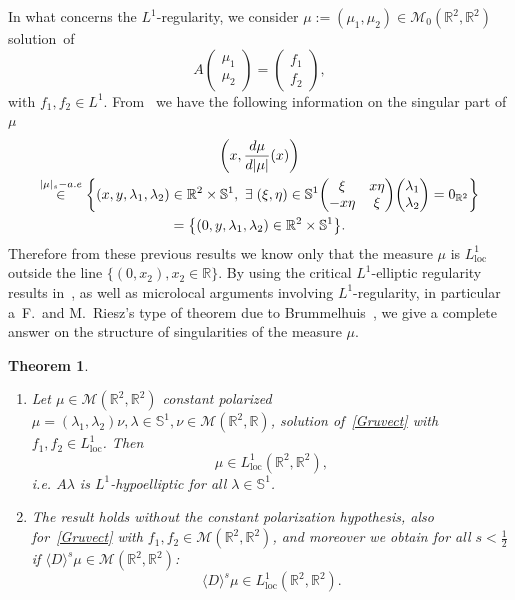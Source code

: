 \documentclass[10pt]{amsart}
\newtheorem{theo}{Theorem}[section]
\theoremstyle{definition}\newtheorem{defi}[theo]{Definition}\newtheorem{rema}[theo]{Remark}\newtheorem{exam}[theo]{Example}\newtheorem{exem}[theo]{Example}\newtheorem{nota}[theo]{Notation}
\DeclareMathOperator{\locc}{loc}
\newcommand{\bbR}{\mathbb{R}}
\newcommand{\bbS}{\mathbb{S}}
\newcommand{\clM}{\mathcal{M}}
\let\originalleft\left
\let\originalright\right
\renewcommand{\left}{\mathopen{}\mathclose\bgroup\originalleft}
\renewcommand{\right}{\aftergroup\egroup\originalright}
\newcommand*{\relabel}{\renewcommand{\labelenumi}{(\theenumi)}}
\newcommand*{\romanenumi}{\renewcommand*{\theenumi}{\roman{enumi}}\relabel}
\let\oldexists\exists
\renewcommand*{\exists}{\mathrel{\oldexists}}
\begin{document}
In what concerns the $L^1$-regularity, we consider $\mu:=(\mu_1,\mu_2)\in \clM_0(\bbR^2,\bbR^2)$ solution~of
\begin{equation}\label{Gruvect}
A
\begin{pmatrix}
\mu_1\\ \mu_2
\end{pmatrix}
=
\begin{pmatrix}
f_1\\ f_2
\end{pmatrix},
\end{equation}
with $f_1,f_2\in L^1$. From~\cite{DePRi} we have the following information on the singular part of $\mu$
\begin{multline*}
\left(x,\frac{d\mu}{d|\mu|}(x)\right)\\
\overset{|\mu|_s-a.e}{\in}\left\{(x,y,\lambda_1,\lambda_2)\in\bbR^2\times \bbS^1,\ \exists (\xi,\eta)\in\bbS^1
\begin{pmatrix}
\xi & x\eta\\ -x\eta & \xi
\end{pmatrix}
\begin{pmatrix}
\lambda_1\\ \lambda_2
\end{pmatrix}
=0_{\bbR^2}\right\}\\
=\left\{(0,y,\lambda_1,\lambda_2)\in\bbR^2\times \bbS^1\right\}.
\end{multline*}
Therefore from these previous results we know only that the measure $\mu$ is $L^1_{\locc}$ outside the line $\{(0,x_2), x_2\in\bbR\}$. By using the critical $L^1$-elliptic regularity results in~\cite{BBWFL1}, as well as microlocal arguments involving $L^1$-regularity, in particular a~F.~and M.~Riesz's type of theorem due to Brummelhuis~\cite{Br}, we give a complete answer on the structure of singularities of the measure $\mu$.



\begin{theo}\leavevmode
\label{thvectL1}
\begin{enumerate}\romanenumi
\item\label{theo1.4.1}%
\!\!
Let $\mu\!\in\! \clM(\bbR^2,\bbR^2)$ constant polarized $\mu=(\lambda_1,\lambda_2)\nu, \lambda\in\bbS^1,\nu\!\in\! \clM(\bbR^2,\bbR)$, solution of~\eqref{Gruvect} with $f_1,f_2\in L^1_{\locc}$. Then
\[
\mu\in L^1_{\locc}(\bbR^2,\bbR^2),
\]
i.e. $A\lambda$ is $L^1$-hypoelliptic for all $\lambda\in\bbS^1$.


\item\label{theo1.4.2} The result holds without the constant polarization hypothesis, also for~\eqref{Gruvect} with $f_1,f_2 \in \clM(\bbR^2,\bbR^2)$, and moreover we obtain for all $s<\frac 12$ if $\langle D\rangle^{s}\mu\in \clM(\bbR^2,\bbR^2)$:
\[
\langle D\rangle^{s}\mu\in L^1_{\locc}(\bbR^2,\bbR^2).
\]
\end{enumerate}
\end{theo}
\end{document}
